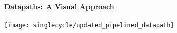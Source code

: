 \begin{blocksection}
\textbf{\underline{Datapaths: A Visual Approach}}\\\\
\texttt{[image: singlecycle/updated\_pipelined\_datapath]}
\end{blocksection}